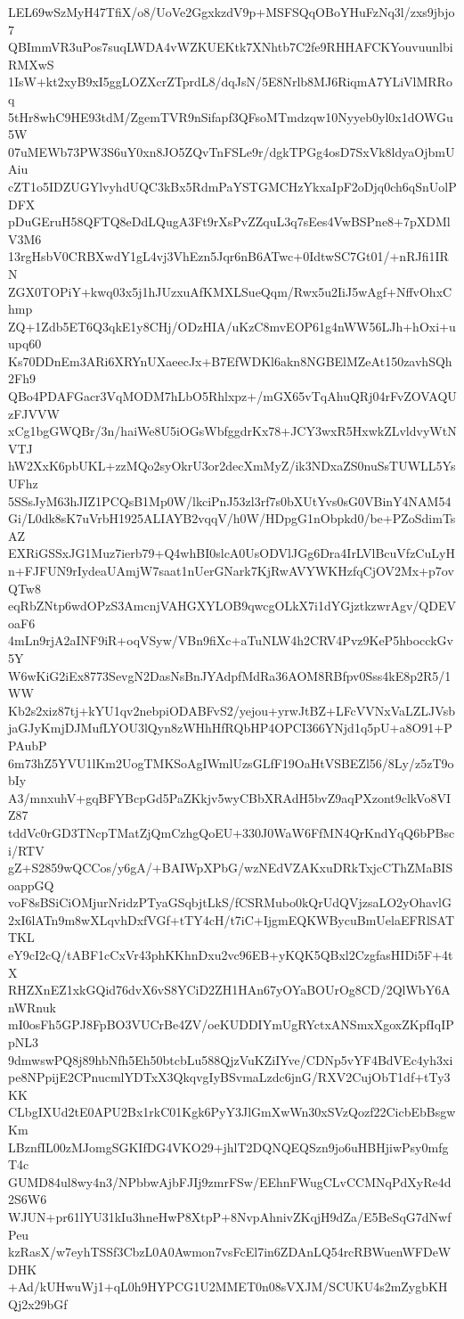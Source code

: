 LEL69wSzMyH47TfiX/o8/UoVe2GgxkzdV9p+MSFSQqOBoYHuFzNq3l/zxs9jbjo7
QBImmVR3uPos7suqLWDA4vWZKUEKtk7XNhtb7C2fe9RHHAFCKYouvuunlbiRMXwS
1IsW+kt2xyB9xI5ggLOZXcrZTprdL8/dqJsN/5E8Nrlb8MJ6RiqmA7YLiVlMRRoq
5tHr8whC9HE93tdM/ZgemTVR9nSifapf3QFsoMTmdzqw10Nyyeb0yl0x1dOWGu5W
07uMEWb73PW3S6uY0xn8JO5ZQvTnFSLe9r/dgkTPGg4osD7SxVk8ldyaOjbmUAiu
cZT1o5IDZUGYlvyhdUQC3kBx5RdmPaYSTGMCHzYkxaIpF2oDjq0ch6qSnUolPDFX
pDuGEruH58QFTQ8eDdLQugA3Ft9rXsPvZZquL3q7sEes4VwBSPne8+7pXDMlV3M6
13rgHsbV0CRBXwdY1gL4vj3VhEzn5Jqr6nB6ATwc+0IdtwSC7Gt01/+nRJfi1IRN
ZGX0TOPiY+kwq03x5j1hJUzxuAfKMXLSueQqm/Rwx5u2IiJ5wAgf+NffvOhxChmp
ZQ+1Zdb5ET6Q3qkE1y8CHj/ODzHIA/uKzC8mvEOP61g4nWW56LJh+hOxi+uupq60
Ks70DDnEm3ARi6XRYnUXaeecJx+B7EfWDKl6akn8NGBElMZeAt150zavhSQh2Fh9
QBo4PDAFGacr3VqMODM7hLbO5Rhlxpz+/mGX65vTqAhuQRj04rFvZOVAQUzFJVVW
xCg1bgGWQBr/3n/haiWe8U5iOGsWbfggdrKx78+JCY3wxR5HxwkZLvldvyWtNVTJ
hW2XxK6pbUKL+zzMQo2syOkrU3or2decXmMyZ/ik3NDxaZS0nuSsTUWLL5YsUFhz
5SSsJyM63hJIZ1PCQsB1Mp0W/lkciPnJ53zl3rf7s0bXUtYvs0sG0VBinY4NAM54
Gi/L0dk8sK7uVrbH1925ALIAYB2vqqV/h0W/HDpgG1nObpkd0/be+PZoSdimTsAZ
EXRiGSSxJG1Muz7ierb79+Q4whBI0slcA0UsODVlJGg6Dra4IrLVlBcuVfzCuLyH
n+FJFUN9rIydeaUAmjW7saat1nUerGNark7KjRwAVYWKHzfqCjOV2Mx+p7ovQTw8
eqRbZNtp6wdOPzS3AmcnjVAHGXYLOB9qwcgOLkX7i1dYGjztkzwrAgv/QDEVoaF6
4mLn9rjA2aINF9iR+oqVSyw/VBn9fiXc+aTuNLW4h2CRV4Pvz9KeP5hbocckGv5Y
W6wKiG2iEx8773SevgN2DasNsBnJYAdpfMdRa36AOM8RBfpv0Sss4kE8p2R5/1WW
Kb2s2xiz87tj+kYU1qv2nebpiODABFvS2/yejou+yrwJtBZ+LFcVVNxVaLZLJVsb
jaGJyKmjDJMufLYOU3lQyn8zWHhHfRQbHP4OPCI366YNjd1q5pU+a8O91+PPAubP
6m73hZ5YVU1lKm2UogTMKSoAgIWmlUzsGLfF19OaHtVSBEZl56/8Ly/z5zT9obIy
A3/mnxuhV+gqBFYBcpGd5PaZKkjv5wyCBbXRAdH5bvZ9aqPXzont9clkVo8VIZ87
tddVc0rGD3TNcpTMatZjQmCzhgQoEU+330J0WaW6FfMN4QrKndYqQ6bPBsci/RTV
gZ+S2859wQCCos/y6gA/+BAIWpXPbG/wzNEdVZAKxuDRkTxjcCThZMaBISoappGQ
voF8sBSiCiOMjurNridzPTyaGSqbjtLkS/fCSRMubo0kQrUdQVjzsaLO2yOhavlG
2xI6lATn9m8wXLqvhDxfVGf+tTY4cH/t7iC+IjgmEQKWBycuBmUelaEFRlSATTKL
eY9cI2cQ/tABF1cCxVr43phKKhnDxu2vc96EB+yKQK5QBxl2CzgfasHIDi5F+4tX
RHZXnEZ1xkGQid76dvX6vS8YCiD2ZH1HAn67yOYaBOUrOg8CD/2QlWbY6AnWRnuk
mI0osFh5GPJ8FpBO3VUCrBe4ZV/oeKUDDIYmUgRYctxANSmxXgoxZKpfIqIPpNL3
9dmwswPQ8j89hbNfh5Eh50btcbLu588QjzVuKZiIYve/CDNp5vYF4BdVEc4yh3xi
pe8NPpijE2CPnucmlYDTxX3QkqvgIyBSvmaLzdc6jnG/RXV2CujObT1df+tTy3KK
CLbgIXUd2tE0APU2Bx1rkC01Kgk6PyY3JlGmXwWn30xSVzQozf22CicbEbBsgwKm
LBznfIL00zMJomgSGKIfDG4VKO29+jhlT2DQNQEQSzn9jo6uHBHjiwPsy0mfgT4c
GUMD84ul8wy4n3/NPbbwAjbFJIj9zmrFSw/EEhnFWugCLvCCMNqPdXyRe4d2S6W6
WJUN+pr61lYU31kIu3hneHwP8XtpP+8NvpAhnivZKqjH9dZa/E5BeSqG7dNwfPeu
kzRasX/w7eyhTSSf3CbzL0A0Awmon7vsFcEl7in6ZDAnLQ54rcRBWuenWFDeWDHK
+Ad/kUHwuWj1+qL0h9HYPCG1U2MMET0n08sVXJM/SCUKU4s2mZygbKHQj2x29bGf
